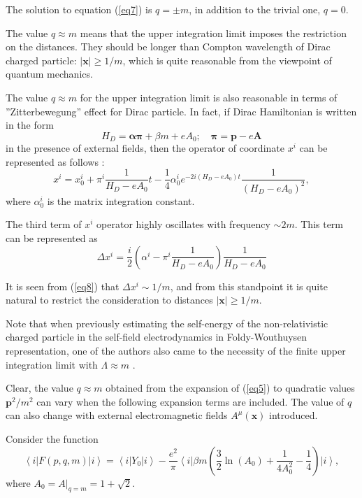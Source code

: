 \documentclass[a4paper,draft,showpacs,preprint,prd,aps]{revtex4}
\begin{document}
The solution to equation (\ref{eq7}) is $q = \pm m$, in addition to the
trivial
one, $q=0$.

The value $q \approx m$ means that the upper integration limit imposes the
restriction on the distances. They should be longer than Compton wavelength
of Dirac charged particle: $|\bm{x}|\ge 1/m$, which is quite reasonable from
the viewpoint of quantum mechanics.

The value $q \approx m$ for the upper integration limit is also reasonable
in terms of ''Zitterbewegung'' effect for Dirac particle. In fact, if Dirac
Hamiltonian is written in the form
\[
H_D=\bm{\alpha}\bm{\pi} + \beta m + eA_0 ;\quad \bm{\pi} = \bm{p}-e\bm{A}
\]
in the presence of external fields, then the operator of coordinate
$x^i$ can be represented as follows \cite{ref2}:
\[
x^i = x_0^i + \pi^i\frac 1{H_D - eA_0}t -
\frac 14\alpha_0^i e^{-2i(H_D - eA_0)t}\frac 1{(H_D-eA_0)^2},
\]
where $\alpha_0^i$ is the matrix integration constant.

The third term of $x^i$ operator highly oscillates with frequency
$\sim 2m$. This term can be represented as
\begin{equation}
\label{eq8}
\Delta x^i = \frac i2\left(\alpha^i-\pi^i\frac 1{H_D - eA_0}\right)\frac
1{H_D - eA_0}
\end{equation}

It is seen from (\ref{eq8}) that $\Delta x^i\sim 1/m$, and from this
standpoint it is quite natural to restrict the consideration to distances
$|\bm{x}| \ge 1/m$.

Note that when previously estimating the self-energy of the non-relativistic
charged particle in the self-field electrodynamics in Foldy-Wouthuysen
representation, one of the authors also came to the necessity of the finite
upper integration limit with $\Lambda \approx m$ \cite{ref3}.

Clear, the value $q \approx m$ obtained from the expansion of (\ref{eq5}) to
quadratic values $\bm{p}^2/m^2$ can vary when the following
expansion terms are included. The value of $q$ can also change with external
electromagnetic fields $A^\mu(\bm{x})$ introduced.

Consider the function
\begin{equation}
\label{eq9}
\left\langle i \right|F(p,q,m)\left| i \right\rangle =
\left\langle i \right|Y_0 \left| i \right\rangle - \frac {e^2}{\pi}
\left\langle i \right|\beta m \left( \frac 32\ln(A_0)+
\frac 1{4A_0^2}-\frac 14 \right)\left| {i} \right\rangle,
\end{equation}
where $A_0 = \left.A\right|_{q = m} = 1 + \sqrt {2}$.
\end{document}
